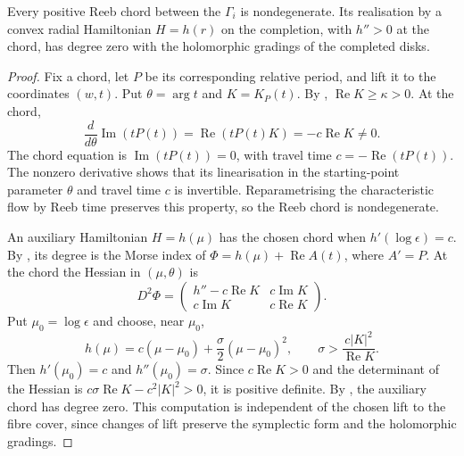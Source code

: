 \documentclass[a4paper]{amsart}
\DeclareMathOperator{\Ree}{Re}
\renewcommand{\Im}{\operatorname{Im}}
\numberwithin{equation}{section}
\begin{document}
\begin{proposition}\label{prop:boundary-indices}
Every positive Reeb chord between the $\Gamma_i$ is nondegenerate.
Its realisation by a convex radial Hamiltonian $H=h(r)$ on the completion,
with $h''>0$ at the chord, has degree zero with the holomorphic gradings
of the completed disks.
\end{proposition}

\begin{proof}
Fix a chord, let $P$ be its corresponding relative period, and lift it
to the coordinates $(w,t)$. Put $\theta=\arg t$ and $K=K_P(t)$.
By , $\Ree K\ge\kappa>0$.
At the chord,
\[
 \frac{d}{d\theta}\Im(tP(t))
 =\Ree(tP(t)K)=-c\Ree K\ne0.
\]
The chord equation is $\Im(tP(t))=0$, with travel time
$c=-\Ree(tP(t))$. The nonzero derivative shows that its linearisation
in the starting-point parameter $\theta$ and travel time $c$ is
invertible. Reparametrising the characteristic flow by Reeb time
preserves this property, so the Reeb chord is nondegenerate.

An auxiliary Hamiltonian $H=h(\mu)$ has the chosen chord when
$h'(\log\epsilon)=c$. By , its degree is the
Morse index of $\Phi=h(\mu)+\Ree A(t)$, where $A'=P$. At the
chord the Hessian in $(\mu,\theta)$ is
\begin{equation}\label{eq:boundary-hessian}
 D^2\Phi=
 \begin{pmatrix}
 h''-c\Ree K&c\Im K\\
 c\Im K&c\Ree K
 \end{pmatrix}.
\end{equation}
Put $\mu_0=\log\epsilon$ and choose, near $\mu_0$,
\[
 h(\mu)=c(\mu-\mu_0)+\frac{\sigma}{2}(\mu-\mu_0)^2,
 \qquad \sigma>\frac{c|K|^2}{\Ree K}.
\]
Then $h'(\mu_0)=c$ and $h''(\mu_0)=\sigma$.
Since $c\Ree K>0$ and the determinant of the Hessian is
$c\sigma\Ree K-c^2|K|^2>0$, it is positive definite.
By , the auxiliary chord has degree zero. This
computation is independent of the chosen lift to the fibre cover,
since changes of lift preserve the symplectic form and the holomorphic
gradings.


\end{proof}
\end{document}
